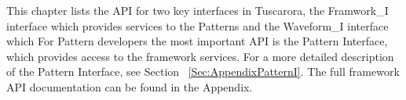 
This chapter lists the API for two key interfaces in Tuscarora, the Framwork_I interface which provides services to the Patterns and the Waveform_I interface which For Pattern developers the most important API is the Pattern Interface, which provides access to the framework services. 
For a more detailed description of the Pattern Interface, see Section ~\ref{Sec:AppendixPatternI}. The full framework API documentation can be found in the Appendix. %

